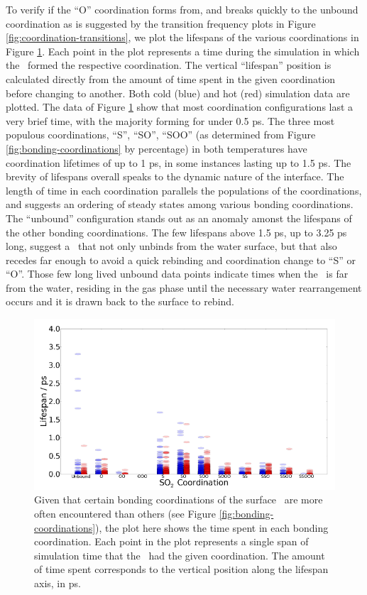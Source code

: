 To verify if the ``O'' coordination forms from, and breaks quickly to the unbound coordination as is suggested by the transition frequency plots in Figure \ref{fig:coordination-transitions}, we plot the lifespans of the various coordinations in Figure \ref{fig:coordination-lifespans}. Each point in the plot represents a time during the simulation in which the \suldiox~formed the respective coordination. The vertical ``lifespan'' position is calculated directly from the amount of time spent in the given coordination before changing to another. Both cold (blue) and hot (red) simulation data are plotted. The data of Figure \ref{fig:coordination-lifespans} show that most coordination configurations last a very brief time, with the majority forming for under 0.5 ps. The three most populous coordinations, ``S'', ``SO'', ``SOO'' (as determined from Figure \ref{fig:bonding-coordinations} by percentage) in both temperatures have coordination lifetimes of up to 1 ps, in some instances lasting up to 1.5 ps. The brevity of lifespans overall speaks to the dynamic nature of the interface. The length of time in each coordination parallels the populations of the coordinations, and suggests an ordering of steady states among various bonding coordinations. The ``unbound'' configuration stands out as an anomaly amonst the lifespans of the other bonding coordinations. The few lifespans above 1.5 ps, up to 3.25 ps long, suggest a \suldiox~that not only unbinds from the water surface, but that also recedes far enough to avoid a quick rebinding and coordination change to ``S'' or ``O''. Those few long lived unbound data points indicate times when the \suldiox~is far from the water, residing in the gas phase until the necessary water rearrangement occurs and it is drawn back to the surface to rebind.

\begin{figure}[h!]
	\begin{center}
		\includegraphics[scale=1.0]{images/coordinations/coordination-lifespans.png}
		\caption{Given that certain bonding coordinations of the surface \suldiox~are more often encountered than others (see Figure \ref{fig:bonding-coordinations}), the plot here shows the time spent in each bonding coordination. Each point in the plot represents a single span of simulation time that the \suldiox~had the given coordination. The amount of time spent corresponds to the vertical position along the lifespan axis, in ps.}
		\label{fig:coordination-lifespans}
	\end{center}
\end{figure}

